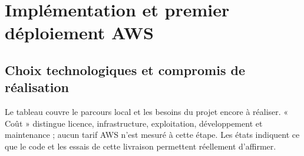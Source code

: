 \chapter{Implémentation et premier déploiement AWS}

\section{Choix technologiques et compromis de réalisation}

Le tableau couvre le parcours local et les besoins du projet encore à réaliser. « Coût » distingue licence, infrastructure, exploitation, développement et maintenance ; aucun tarif AWS n'est mesuré à cette étape. Les états indiquent ce que le code et les essais de cette livraison permettent réellement d'affirmer.

